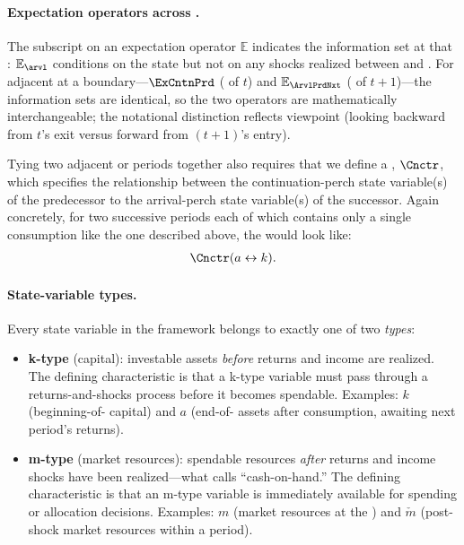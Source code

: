 \documentclass[titlepage, headings=optiontotocandhead]{econark}
\begin{document}
\hypertarget{expectation-operators}{}
\paragraph{Expectation operators across {\prchs}.}  The subscript on an expectation operator ${\mathbb{E}}$ indicates the information set at that {\prch}: ${\mathbb{E}}_{\arvl}$ conditions on the {\Arrival} state but not on any shocks realized between {\Arrival} and {\Decision}.  For adjacent {\prchs} at a {\interval} boundary---$\ExCntnPrd$ ({\Continuation} of {\interval} $t$) and ${\mathbb{E}}_{\ArvlPrdNxt}$ ({\Arrival} of {\interval} $t+1$)---the information sets are identical, so the two operators are mathematically interchangeable; the notational distinction reflects viewpoint (looking backward from $t$'s exit versus forward from $(t+1)$'s entry).

Tying two adjacent {\stgs} or periods together also requires that we define a {\Cnct}, ${\Cnctr}$, which specifies the relationship between the continuation-perch state variable(s) of the predecessor to the arrival-perch state variable(s) of the successor. Again concretely, for two successive periods each of which contains only a single consumption {\stg} like the one described above, the {\Cnct} would look like:
  \begin{equation}\begin{gathered}\begin{aligned} \label{eq:last-stg-v-is-end-prd-v} 
        \Cnctr(a \leftrightarrow k).
      \end{aligned}\end{gathered}\end{equation}

\hypertarget{state-variable-types}{}
\paragraph{State-variable types.}
Every state variable in the framework belongs to exactly one of two
\textit{types}:

\begin{itemize}
  \item \textbf{k-type} (capital): investable assets \textit{before}
    returns and income are realized. The defining characteristic is that
    a k-type variable must pass through a returns-and-shocks process
    before it becomes spendable. Examples: $k$
    (beginning-of-{\interval} capital) and $a$ (end-of-{\interval}
    assets after consumption, awaiting next period's returns).

  \item \textbf{m-type} (market resources): spendable resources
    \textit{after} returns and income shocks have been
    realized---what \citet{deatonUnderstandingC} calls ``cash-on-hand.''
    The defining characteristic is that an m-type variable is immediately
    available for spending or allocation decisions. Examples: $m$
    (market resources at the {\Decision} {\prch}) and $\check{m}$
    (post-shock market resources within a period).
\end{itemize}
\end{document}
